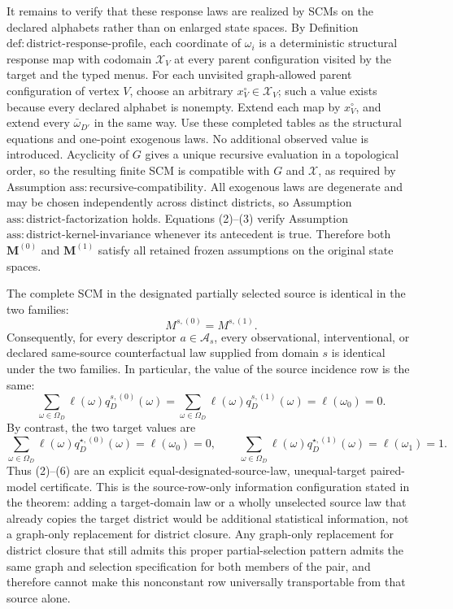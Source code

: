 It remains to verify that these response laws are realized by SCMs on the declared alphabets rather than on enlarged state spaces. By Definition \(\mathrm{def:district\text{-}response\text{-}profile}\), each coordinate of \(\omega_i\) is a deterministic structural response map with codomain \(\mathcal X_V\) at every parent configuration visited by the target and the typed menus. For each unvisited graph-allowed parent configuration of vertex \(V\), choose an arbitrary \(x_V^\circ\in\mathcal X_V\); such a value exists because every declared alphabet is nonempty. Extend each map by \(x_V^\circ\), and extend every \(\bar\omega_{D'}\) in the same way. Use these completed tables as the structural equations and one-point exogenous laws. No additional observed value is introduced. Acyclicity of \(G\) gives a unique recursive evaluation in a topological order, so the resulting finite SCM is compatible with \(G\) and \(\mathcal X\), as required by Assumption \(\mathrm{ass:recursive\text{-}compatibility}\). All exogenous laws are degenerate and may be chosen independently across distinct districts, so Assumption \(\mathrm{ass:district\text{-}factorization}\) holds. Equations (2)--(3) verify Assumption \(\mathrm{ass:district\text{-}kernel\text{-}invariance}\) whenever its antecedent is true. Therefore both \(\mathbf M^{(0)}\) and \(\mathbf M^{(1)}\) satisfy all retained frozen assumptions on the original state spaces.

The complete SCM in the designated partially selected source is identical in the two families:
\[
M^{s,(0)}=M^{s,(1)}.
\tag{4}
\]
Consequently, for every descriptor \(a\in\mathcal A_s\), every observational, interventional, or declared same-source counterfactual law supplied from domain \(s\) is identical under the two families. In particular, the value of the source incidence row is the same:
\[
\sum_{\omega\in\Omega_D}\ell(\omega)q_D^{s,(0)}(\omega)
=
\sum_{\omega\in\Omega_D}\ell(\omega)q_D^{s,(1)}(\omega)
=\ell(\omega_0)=0.
\tag{5}
\]
By contrast, the two target values are
\[
\sum_{\omega\in\Omega_D}\ell(\omega)q_D^{\star,(0)}(\omega)
=\ell(\omega_0)=0,
\qquad
\sum_{\omega\in\Omega_D}\ell(\omega)q_D^{\star,(1)}(\omega)
=\ell(\omega_1)=1.
\tag{6}
\]
Thus (2)--(6) are an explicit equal-designated-source-law, unequal-target paired-model certificate. This is the source-row-only information configuration stated in the theorem: adding a target-domain law or a wholly unselected source law that already copies the target district would be additional statistical information, not a graph-only replacement for district closure. Any graph-only replacement for district closure that still admits this proper partial-selection pattern admits the same graph and selection specification for both members of the pair, and therefore cannot make this nonconstant row universally transportable from that source alone.

